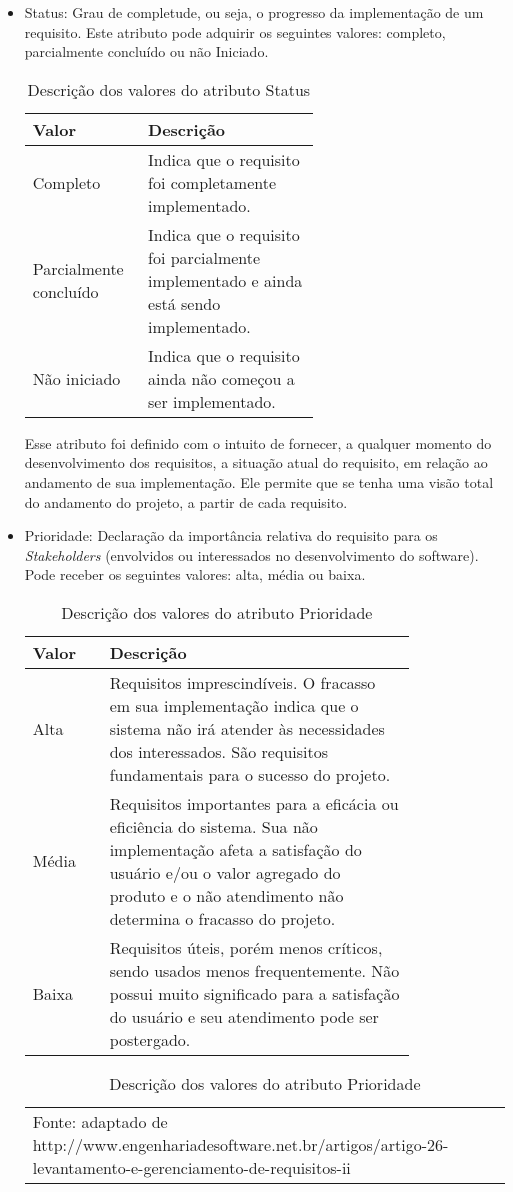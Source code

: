 \begin{itemize}
\item Status:
Grau de completude, ou seja, o progresso da implementação de um requisito. Este atributo pode adquirir os seguintes valores: completo, parcialmente concluído ou não Iniciado.

\begin{table}[h]
\centering
\caption{Descrição dos valores do atributo Status}
\label{Rotulo}
\begin{tabular}{ | l | p{0.6\linewidth} | }
\hline
\textbf{Valor} & \textbf{Descrição} \\ \hline
Completo &  Indica que o requisito foi completamente implementado. \\ \hline
Parcialmente concluído & Indica que o requisito foi parcialmente implementado e ainda está sendo implementado. \\ \hline
Não iniciado & Indica que o requisito ainda não começou a ser implementado. \\ \hline
\end{tabular}
\end{table}

Esse atributo foi definido com o intuito de fornecer, a qualquer momento do desenvolvimento dos requisitos, a situação atual do requisito, em relação ao andamento de sua implementação. Ele permite que se tenha uma visão total do andamento do projeto, a partir de cada requisito.

\item Prioridade:
Declaração da importância relativa do requisito para os \textit{Stakeholders} (envolvidos ou interessados no desenvolvimento do software). Pode receber os seguintes valores: alta, média ou baixa.

\begin{table}[h]
\centering
\caption{Descrição dos valores do atributo Prioridade}
\label{Rotulo}
\begin{tabular}{ | l | p{0.8\linewidth} | }
\hline
\textbf{Valor} & \textbf{Descrição} \\ \hline
Alta &  Requisitos imprescindíveis. O fracasso em sua implementação indica que o sistema não irá atender às necessidades dos interessados. São requisitos fundamentais para o sucesso do projeto. \\ \hline
Média & Requisitos importantes para a eficácia ou eficiência do sistema. Sua não implementação afeta a satisfação do usuário e/ou o valor agregado do produto e o não atendimento não determina o fracasso do projeto. \\ \hline
Baixa & Requisitos úteis, porém menos críticos, sendo usados menos frequentemente. Não possui muito significado para a satisfação do usuário e seu atendimento pode ser postergado. \\ \hline
\end{tabular}
\begin{tabular} { l }
\tiny Fonte: adaptado de  http://www.engenhariadesoftware.net.br/artigos/artigo-26-levantamento-e-gerenciamento-de-requisitos-ii 
\end{tabular}
\end{table}


\end{itemize}
